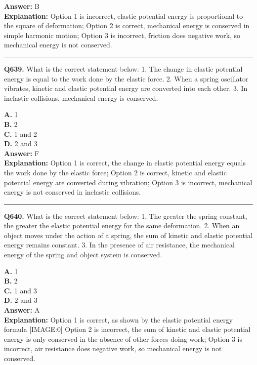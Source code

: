 \documentclass[12pt]{article}
\begin{document}
\textbf{Answer:} B \\
\textbf{Explanation:} Option 1 is incorrect, elastic potential energy is proportional to the square of deformation; Option 2 is correct, mechanical energy is conserved in simple harmonic motion; Option 3 is incorrect, friction does negative work, so mechanical energy is not conserved.

\hrule
\vspace{1em}


\noindent
\textbf{Q639.} What is the correct statement below:
1.
The change in elastic potential energy is equal to the work done by the elastic force.
2.
When a spring oscillator vibrates, kinetic and elastic potential energy are converted into each other.
3.
In inelastic collisions, mechanical energy is conserved.



\textbf{A.} 1 \\
\textbf{B.} 2 \\
\textbf{C.} 1 and 2 \\
\textbf{D.} 2 and 3 \\

\textbf{Answer:} F \\
\textbf{Explanation:} Option 1 is correct, the change in elastic potential energy equals the work done by the elastic force; Option 2 is correct, kinetic and elastic potential energy are converted during vibration; Option 3 is incorrect, mechanical energy is not conserved in inelastic collisions.

\hrule
\vspace{1em}


\noindent
\textbf{Q640.} What is the correct statement below:
1.
The greater the spring constant, the greater the elastic potential energy for the same deformation.
2.
When an object moves under the action of a spring, the sum of kinetic and elastic potential energy remains constant.
3.
In the presence of air resistance, the mechanical energy of the spring and object system is conserved.



\textbf{A.} 1 \\
\textbf{B.} 2 \\
\textbf{C.} 1 and 3 \\
\textbf{D.} 2 and 3 \\

\textbf{Answer:} A \\
\textbf{Explanation:} Option 1 is correct, as shown by the elastic potential energy formula
[IMAGE:0]
Option 2 is incorrect, the sum of kinetic and elastic potential energy is only conserved in the absence of other forces doing work; Option 3 is incorrect, air resistance does negative work, so mechanical energy is not conserved.
\end{document}
